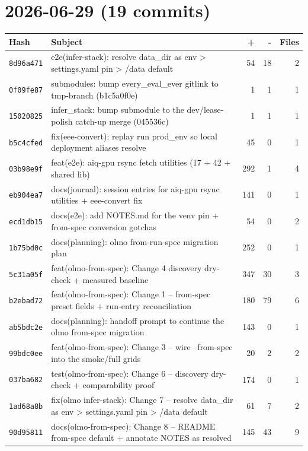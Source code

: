 \section*{2026-06-29 (19 commits)}
\begin{longtable}{@{}p{}p{}r r r@{}}
\toprule Hash & Subject & + & - & Files \\ \midrule\endhead
\texttt{8d96a471} & e2e(infer-stack): resolve data\_dir as env > settings.yaml pin > /data default & 54 & 18 & 2 \\
\texttt{0f09fe87} & submodules: bump every\_eval\_ever gitlink to tmp-branch (b1c5a0f0e) & 1 & 1 & 1 \\
\texttt{15020825} & infer\_stack: bump submodule to the dev/lease-polish catch-up merge (045536c) & 1 & 1 & 1 \\
\texttt{b5c4cfed} & fix(eee-convert): replay run prod\_env so local deployment aliases resolve & 45 & 0 & 1 \\
\texttt{03b98e9f} & feat(e2e): aiq-gpu rsync fetch utilities (17 + 42 + shared lib) & 292 & 1 & 4 \\
\texttt{eb904ea7} & docs(journal): session entries for aiq-gpu rsync utilities + eee-convert fix & 141 & 0 & 1 \\
\texttt{ecd1db15} & docs(e2e): add NOTES.md for the venv pin + from-spec conversion gotchas & 54 & 0 & 2 \\
\texttt{1b75bd0c} & docs(planning): olmo from-run-spec migration plan & 252 & 0 & 1 \\
\texttt{5c31a05f} & feat(olmo-from-spec): Change 4 discovery dry-check + measured baseline & 347 & 30 & 3 \\
\texttt{b2ebad72} & feat(olmo-from-spec): Change 1 -- from-spec preset fields + run-entry reconciliation & 180 & 79 & 6 \\
\texttt{ab5bdc2e} & docs(planning): handoff prompt to continue the olmo from-spec migration & 143 & 0 & 1 \\
\texttt{99bdc0ee} & feat(olmo-from-spec): Change 3 -- wire --from-spec into the smoke/full grids & 20 & 2 & 2 \\
\texttt{037ba682} & test(olmo-from-spec): Change 6 -- discovery dry-check + comparability proof & 174 & 0 & 1 \\
\texttt{1ad68a8b} & fix(olmo infer-stack): Change 7 -- resolve data\_dir as env > settings.yaml pin > /data default & 61 & 7 & 2 \\
\texttt{90d95811} & docs(olmo-from-spec): Change 8 -- README from-spec default + annotate NOTES as resolved & 145 & 43 & 9 \\

\end{longtable}
